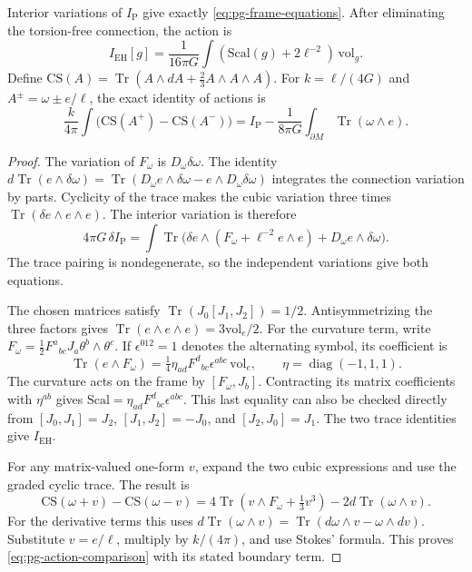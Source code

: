\begin{proposition}\label{prop:pg-action}
Interior variations of $I_{\mathrm P}$ give exactly \eqref{eq:pg-frame-equations}.
After eliminating the torsion-free connection, the action is
\[
 I_{\mathrm{EH}}[g]=\frac1{16\pi G}\int
          (\mathrm{Scal}(g)+2\ell^{-2})\,\mathrm{vol}_g.
\]
Define $\mathrm{CS}(A)=\operatorname{Tr}(A\wedge dA+\tfrac23A\wedge A\wedge A)$.
For $k=\ell/(4G)$ and $A^\pm=\omega\pm e/\ell$, the exact identity of actions is
\begin{equation}\label{eq:pg-action-comparison}
 \frac{k}{4\pi}\int\bigl(\mathrm{CS}(A^+)-\mathrm{CS}(A^-)\bigr)
 =I_{\mathrm P}-\frac1{8\pi G}\int_{\partial M}\operatorname{Tr}(\omega\wedge e).
\end{equation}
\end{proposition}
\begin{proof}
The variation of $F_\omega$ is $D_\omega\delta\omega$.
The identity
$d\operatorname{Tr}(e\wedge\delta\omega)
=\operatorname{Tr}(D_\omega e\wedge\delta\omega-e\wedge D_\omega\delta\omega)$
integrates the connection variation by parts.
Cyclicity of the trace makes the cubic variation three times
$\operatorname{Tr}(\delta e\wedge e\wedge e)$.
The interior variation is therefore
\[
 4\pi G\,\delta I_{\mathrm P}
 =\int\operatorname{Tr}\bigl(
   \delta e\wedge(F_\omega+\ell^{-2}e\wedge e)
   +D_\omega e\wedge\delta\omega\bigr).
\]
The trace pairing is nondegenerate, so the independent variations give both equations.

The chosen matrices satisfy
$\operatorname{Tr}(J_0[J_1,J_2])=1/2$.
Antisymmetrizing the three factors gives
$\operatorname{Tr}(e\wedge e\wedge e)=3\mathrm{vol}_e/2$.
For the curvature term, write
$F_\omega=\tfrac12F^a{}_{bc}J_a\theta^b\wedge\theta^c$.
If $\epsilon^{012}=1$ denotes the alternating symbol, its coefficient is
\[
 \operatorname{Tr}(e\wedge F_\omega)
   =\tfrac14\eta_{ad}F^d{}_{bc}\epsilon^{abc}\,\mathrm{vol}_e,
 \qquad \eta=\operatorname{diag}(-1,1,1).
\]
The curvature acts on the frame by $[F_\omega,J_b]$.
Contracting its matrix coefficients with $\eta^{ab}$ gives
$\mathrm{Scal}=\eta_{ad}F^d{}_{bc}\epsilon^{abc}$.
This last equality can also be checked directly from
$[J_0,J_1]=J_2$, $[J_1,J_2]=-J_0$, and $[J_2,J_0]=J_1$.
The two trace identities give $I_{\mathrm{EH}}$.

For any matrix-valued one-form $v$, expand the two cubic expressions and use the graded cyclic trace.
The result is
\[
 \mathrm{CS}(\omega+v)-\mathrm{CS}(\omega-v)
 =4\operatorname{Tr}(v\wedge F_\omega+\tfrac13v^3)
     -2d\operatorname{Tr}(\omega\wedge v).
\]
For the derivative terms this uses
$d\operatorname{Tr}(\omega\wedge v)
=\operatorname{Tr}(d\omega\wedge v-\omega\wedge dv)$.
Substitute $v=e/\ell$, multiply by $k/(4\pi)$, and use Stokes' formula.
This proves \eqref{eq:pg-action-comparison} with its stated boundary term.
\end{proof}

